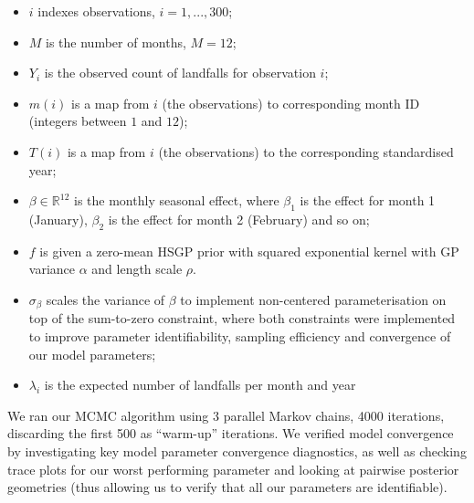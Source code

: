 \documentclass[
]{article}
\providecommand{\tightlist}{%
  \setlength{\itemsep}{0pt}\setlength{\parskip}{0pt}}
\begin{document}
\begin{itemize}
\tightlist
\item
  \(i\) indexes observations, \(i=1,...,300\);
\item
  \(M\) is the number of months, \(M = 12\);
\item
  \(Y_{i}\) is the observed count of landfalls for observation \(i\);
\item
  \(m(i)\) is a map from \(i\) (the observations) to corresponding month ID (integers between \(1\) and \(12\));
\item
  \(T(i)\) is a map from \(i\) (the observations) to the corresponding standardised year;
\item
  \(\beta \in \mathbb{R}^{12}\) is the monthly seasonal effect, where \(\beta_1\) is the effect for month 1 (January), \(\beta_2\) is the effect for month 2 (February) and so on;
\item
  \(f\) is given a zero-mean HSGP prior with squared exponential kernel with GP variance \(\alpha\) and length scale \(\rho\).\\
\item
  \(\sigma_{\beta}\) scales the variance of \(\beta\) to implement non-centered parameterisation on top of the sum-to-zero constraint, where both constraints were implemented to improve parameter identifiability, sampling efficiency and convergence of our model parameters;
\item
  \(\lambda_{i}\) is the expected number of landfalls per month and year
\end{itemize}

We ran our MCMC algorithm using 3 parallel Markov chains, 4000 iterations, discarding the first 500 as ``warm-up'' iterations. We verified model convergence by investigating key model parameter convergence diagnostics, as well as checking trace plots for our worst performing parameter and looking at pairwise posterior geometries (thus allowing us to verify that all our parameters are identifiable).
\end{document}
